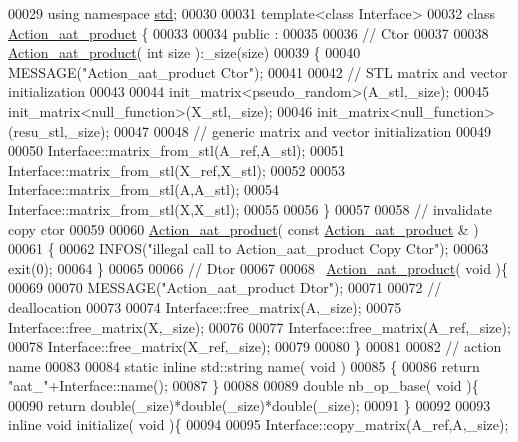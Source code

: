 \begin{DoxyCode}
00029 \textcolor{keyword}{using namespace }\hyperlink{namespacestd}{std};
00030 
00031 \textcolor{keyword}{template}<\textcolor{keyword}{class} Interface>
00032 \textcolor{keyword}{class }\hyperlink{class_action__aat__product}{Action\_aat\_product} \{
00033 
00034 public :
00035 
00036   \textcolor{comment}{// Ctor}
00037 
00038   \hyperlink{class_action__aat__product}{Action\_aat\_product}( \textcolor{keywordtype}{int} size ):\_size(size)
00039   \{
00040     MESSAGE(\textcolor{stringliteral}{"Action\_aat\_product Ctor"});
00041 
00042     \textcolor{comment}{// STL matrix and vector initialization}
00043 
00044     init\_matrix<pseudo\_random>(A\_stl,\_size);
00045     init\_matrix<null\_function>(X\_stl,\_size);
00046     init\_matrix<null\_function>(resu\_stl,\_size);
00047 
00048     \textcolor{comment}{// generic matrix and vector initialization}
00049 
00050     Interface::matrix\_from\_stl(A\_ref,A\_stl);
00051     Interface::matrix\_from\_stl(X\_ref,X\_stl);
00052 
00053     Interface::matrix\_from\_stl(A,A\_stl);
00054     Interface::matrix\_from\_stl(X,X\_stl);
00055 
00056   \}
00057 
00058   \textcolor{comment}{// invalidate copy ctor}
00059 
00060   \hyperlink{class_action__aat__product}{Action\_aat\_product}( \textcolor{keyword}{const}  \hyperlink{class_action__aat__product}{Action\_aat\_product} & )
00061   \{
00062     INFOS(\textcolor{stringliteral}{"illegal call to Action\_aat\_product Copy Ctor"});
00063     exit(0);
00064   \}
00065 
00066   \textcolor{comment}{// Dtor}
00067 
00068   ~\hyperlink{class_action__aat__product}{Action\_aat\_product}( \textcolor{keywordtype}{void} )\{
00069 
00070     MESSAGE(\textcolor{stringliteral}{"Action\_aat\_product Dtor"});
00071 
00072     \textcolor{comment}{// deallocation}
00073 
00074     Interface::free\_matrix(A,\_size);
00075     Interface::free\_matrix(X,\_size);
00076 
00077     Interface::free\_matrix(A\_ref,\_size);
00078     Interface::free\_matrix(X\_ref,\_size);
00079 
00080   \}
00081 
00082   \textcolor{comment}{// action name}
00083 
00084   \textcolor{keyword}{static} \textcolor{keyword}{inline} std::string name( \textcolor{keywordtype}{void} )
00085   \{
00086     \textcolor{keywordflow}{return} \textcolor{stringliteral}{"aat\_"}+Interface::name();
00087   \}
00088 
00089   \textcolor{keywordtype}{double} nb\_op\_base( \textcolor{keywordtype}{void} )\{
00090     \textcolor{keywordflow}{return} double(\_size)*double(\_size)*double(\_size);
00091   \}
00092 
00093   \textcolor{keyword}{inline} \textcolor{keywordtype}{void} initialize( \textcolor{keywordtype}{void} )\{
00094 
00095     Interface::copy\_matrix(A\_ref,A,\_size);

\end{DoxyCode}
